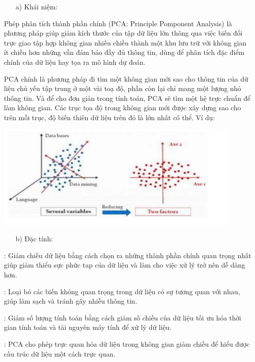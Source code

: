 \documentclass[12pt,a4paper]{article}
\begin{document}
\begin{itemize}
    \item[a)] Khái niệm:
\end{itemize}

Phép phân tích thành phần chính (PCA: Principle Pomponent Analysis) là phương pháp giúp giảm kích thước của tập dữ liệu lớn thông qua việc biến đổi trực giao tập hợp không gian nhiều chiều thành một khu lưu trữ với không gian ít chiều hơn những vẫn đảm bảo đầy đủ thông tin, dùng để phân tích đặc điểm chính của dữ liệu hay tọa ra mô hình dự đoán.

PCA chính là phương pháp đi tìm một không gian mới sao cho thông tin của dữ liệu chủ yếu tập trung ở một vài toạ độ, phần còn lại chỉ mang một lượng nhỏ thông tin. Và để cho đơn giản trong tính toán, PCA sẽ tìm một hệ trực chuẩn để làm không gian. Các trục tọa độ trong không gian mới được xây dựng sao cho trên mỗi trục, độ biến thiên dữ liệu trên đó là lớn nhất có thể. Ví dụ:
\begin{center}
    \includegraphics[width = 0.9\textwidth]{2.png}
\end{center}
\begin{itemize}
    \item[b)] Đặc tính:
\end{itemize}

: Giảm chiều dữ liệu bằng cách chọn ra những thành phần chính quan trọng nhất giúp giảm thiểu sực phức tap của dữ liệu và làm cho việc xử lý trở nên dễ dàng hơn.

: Loại bỏ các biến không quan trọng trong dữ liệu có sự tương quan với nhau, giúp làm sạch và tránh gây nhiễu thông tin.

: Giảm số lượng tính toán bằng cách giảm số chiều của dữ liệu tối ưu hóa thời gian tính toán và tài nguyên máy tính để xử lý dữ liệu.

: PCA cho phép trực quan hóa dữ liệu trong không gian giảm chiều để hiểu được cấu trúc dữ liệu một cách trực quan.
\end{document}
